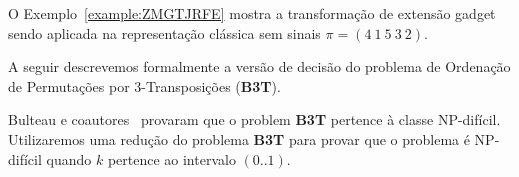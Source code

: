 

O Exemplo~\ref{example:ZMGTJRFE} mostra a transformação de extensão gadget sendo aplicada na representação clássica sem sinais $\pi=(4~1~5~3~2)$.



A seguir descrevemos formalmente a versão de decisão do problema de Ordenação de Permutações por 3-Transposições (\textbf{B3T}).

\begin{decision}
\end{decision}

Bulteau e coautores~\cite{2012-bulteau-etal} provaram que o problem \textbf{B3T} pertence à classe NP-difícil. Utilizaremos uma redução do problema \textbf{B3T} para provar que o problema \SbPRT{} é NP-difícil quando $k$ pertence ao intervalo $(0..1)$.

